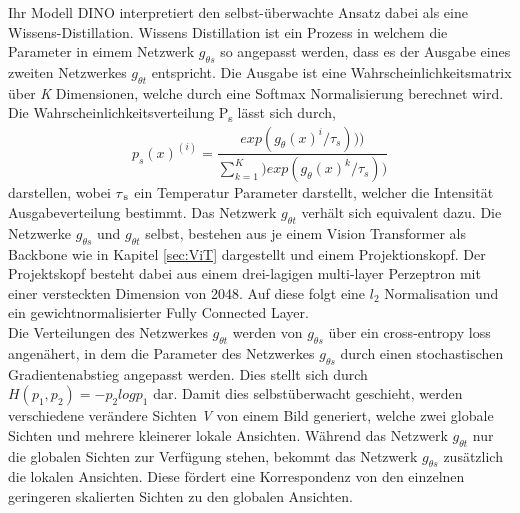 		Ihr Modell DINO interpretiert den selbst-überwachte Ansatz dabei als eine Wissens-Distillation. 
		Wissens Distillation ist ein Prozess in welchem die Parameter in eimem Netzwerk $ g_{\theta s}$ so angepasst werden, dass es der Ausgabe eines zweiten Netzwerkes $g_{\theta t}$ entspricht. Die Ausgabe ist eine Wahrscheinlichkeitsmatrix über \textit{K} Dimensionen, welche durch eine Softmax Normalisierung berechnet wird. \\
		Die Wahrscheinlichkeitsverteilung P\textsubscript s lässt sich durch, 
		\[ p_{s}(x)^{(i)} = \frac{exp(g_{\theta}(x)^{i}/\tau_{s})))}{\sum_{k=1}^{K})exp(g_{\theta}(x)^{k}/\tau_{s}))}	\]
		darstellen, wobei $\tau \textsubscript s $ ein Temperatur Parameter darstellt, welcher die Intensität Ausgabeverteilung bestimmt. Das Netzwerk  $g_{\theta t}$ verhält sich equivalent dazu. Die Netzwerke  $g_{\theta s}$ und  $g_{\theta t}$ selbst, bestehen aus je einem Vision Transformer als Backbone wie in Kapitel \ref{sec:ViT} dargestellt und einem Projektionskopf. Der Projektskopf besteht dabei aus einem drei-lagigen multi-layer Perzeptron mit einer versteckten Dimension von 2048. Auf diese folgt eine $l_{2}$ Normalisation und ein gewichtnormalisierter Fully Connected Layer. \\
		Die Verteilungen des Netzwerkes $g_{\theta t}$ werden von $g_{\theta s}$ über ein cross-entropy loss angenähert, in dem die Parameter des Netzwerkes $g_{\theta s}$ durch einen stochastischen Gradientenabstieg angepasst werden. Dies stellt sich durch  $ H(p_1, p_2) = - p_2 log p_1$ dar.
		Damit dies selbstüberwacht geschieht, werden verschiedene verändere Sichten \textit{V} von einem Bild generiert, welche zwei globale Sichten und mehrere kleinerer lokale Ansichten. Während das Netzwerk $g_{\theta t}$  nur die globalen Sichten zur Verfügung stehen, bekommt das Netzwerk $g_{\theta s}$ zusätzlich die lokalen Ansichten. Diese fördert eine Korrespondenz von den einzelnen geringeren skalierten Sichten zu den globalen Ansichten. \\
		
